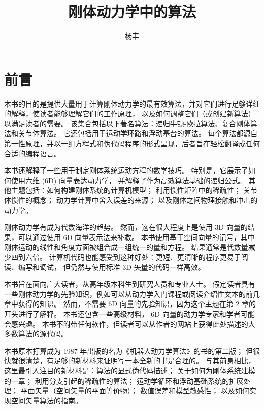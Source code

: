 \documentclass{ctexart}
\numberwithin{equation}{section}
\begin{document}
\title{刚体动力学中的算法}

\author{杨丰}
\date{}
\maketitle
\section*{前言}
本书的目的是提供大量用于计算刚体动力学的最有效算法，并对它们进行足够详细的解释，使读者能够理解它们的工作原理，
以及如何调整它们（或创建新算法） 以满足读者的需要。 
该集合包括以下著名算法：递归牛顿-欧拉算法、复合刚体算法和关节体算法。 它还包括用于运动学环路和浮动基台的算法。 
每个算法都源自第一性原理，并以一组方程式和伪代码程序的形式呈现，后者旨在轻松翻译成任何合适的编程语言。

本书还解释了一些用于制定刚体系统运动方程的数学技巧。 特别是，它展示了如何使用六维 (6D) 向量表达动力学，
并解释了作为高效算法基础的递归公式。 其他主题包括：如何构建刚体系统的计算机模型； 
利用惯性矩阵中的稀疏性； 关节体惯性的概念； 动力学计算中舍入误差的来源； 以及刚体之间物理接触和冲击的动力学。

刚体动力学有成为代数海洋的趋势。 然而，这在很大程度上是使用 3D 向量的结果，可以通过使用 6D 向量表示法来补救。 
本书使用基于空间向量的记号，其中刚体运动的线性和角度方面被组合成一组统一的量和方程。 
结果通常是代数量减少四到六倍。 计算机代码也能感受到这种好处：更短、更清晰的程序更易于阅读、编写和调试，
但仍然与使用标准 3D 矢量的代码一样高效。

本书旨在面向广大读者，从高年级本科生到研究人员和专业人士。 
假定读者具有一些刚体动力学的先验知识，例如可以从动力学入门课程或阅读介绍性文本的前几章中获得的知识。 
然而，不需要 6D 向量的先验知识，因为这个主题在第 2 章的开头进行了解释。
本书还包含一些高级材料， 6D 向量的动力学专家和学者可能会感兴趣。 
本书不附带任何软件，但读者可以从作者的网站上获得此处描述的大多数算法的源代码。

本书原本打算成为 1987 年出版的名为《机器人动力学算法》的书的第二版； 
但很快就很清楚，有足够的新材料来证明写一本全新的书是合理的。 
与其前身相比，这里最引人注目的新材料是：算法的显式伪代码描述； 
关于如何为刚体系统建模的一章； 利用分支引起的稀疏性的算法； 
运动学循环和浮动基础系统的扩展处理； 平面矢量（空间矢量的平面等价物）； 
数值误差和模型敏感性； 以及如何实现空间矢量算法的指南。

\newpage
\tableofcontents
\end{document}
